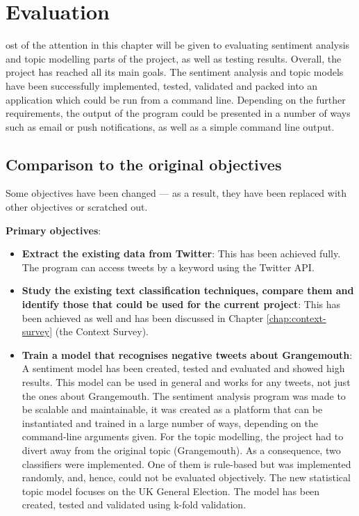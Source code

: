 \let\textcircled=\pgftextcircled
\chapter{Evaluation}
\label{chap:evaluation}


ost of the attention in this chapter will be given to evaluating sentiment analysis and topic modelling parts of the project, as well as testing results.
Overall, the project has reached all its main goals. The sentiment analysis and topic models have been successfully implemented, tested, validated and packed into an application which could be run from a command line. Depending on the further requirements, the output of the program could be presented in a number of ways such as email or push notifications, as well as a simple command line output. 

\section{Comparison to the original objectives}
Some objectives have been changed --- as a result, they have been replaced with other objectives or scratched out. 

\label{sec:originalObjectives}
\textbf{Primary objectives}:
\begin{itemize}
    \item \textbf{Extract the existing data from Twitter}: This has been achieved fully. The program can access tweets by a keyword using the Twitter API. 
    \item \textbf{Study the existing text classification techniques, compare them and identify those that could be used for the current project}: This has been achieved as well and has been discussed in Chapter \ref{chap:context-survey} (the Context Survey). 
    \item \textbf{Train a model that recognises negative tweets about Grangemouth}: A sentiment model has been created, tested and evaluated and showed high results. This model can be used in general and works for any tweets, not just the ones about Grangemouth. The sentiment analysis program was made to be scalable and maintainable, it was created as a platform that can be instantiated and trained in a large number of ways, depending on the command-line arguments given. For the topic modelling, the project had to divert away from the original topic (Grangemouth). As a consequence, two classifiers were implemented. One of them is rule-based but was implemented randomly, and, hence, could not be evaluated objectively. The new statistical topic model focuses on the UK General Election. The model has been created, tested and validated using k-fold validation. 
\end{itemize}

